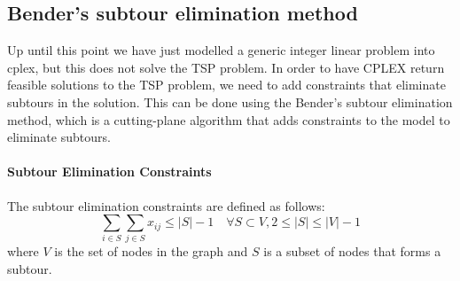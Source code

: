 \documentclass{article}
\begin{document}
\subsection{Bender's subtour elimination method} 
Up until this point we have just modelled a generic integer linear problem into cplex, but this does not solve the TSP problem.
In order to have CPLEX return feasible solutions to the TSP problem, we need to add constraints that eliminate subtours in the solution.
This can be done using the Bender's subtour elimination method, which is a cutting-plane algorithm that adds constraints to the model to eliminate subtours.

\paragraph{Subtour Elimination Constraints}
The subtour elimination constraints are defined as follows: 
\begin{equation}
	\sum_{i \in S} \sum_{j \in S} x_{ij} \leq |S| - 1 \quad \forall S \subset V, 2 \leq |S| \leq |V| - 1
\end{equation}
where $V$ is the set of nodes in the graph and $S$ is a subset of nodes that forms a subtour.
\end{document}
